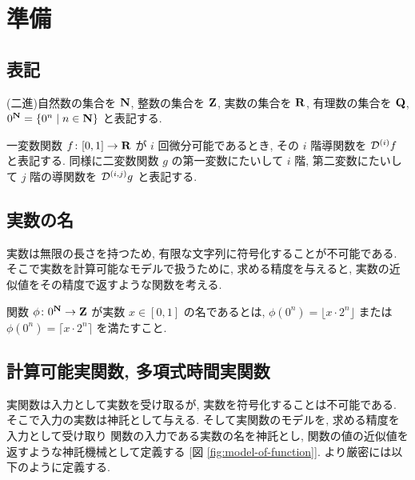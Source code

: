 \section{準備}
\label{section: preliminaries}

\subsection{表記}
(二進)自然数の集合を $\mathbf N$, 整数の集合を $\mathbf Z$, 実数の集合を $\mathbf R$, 
有理数の集合を $\mathbf Q$, $0^\mathbf N = \{0^n \mid n \in \mathbf N\}$ と表記する. 

一変数関数 $f\colon [0,1] \to \mathbf R$ が $i$ 回微分可能であるとき,
その $i$ 階導関数を $\mathcal D^{(i)}f$ と表記する.
同様に二変数関数 $g$ の第一変数にたいして $i$ 階, 第二変数にたいして $j$ 階の導関数を $\mathcal D^{(i,j)}g$ と表記する.

\subsection{実数の名}
 実数は無限の長さを持つため, 有限な文字列に符号化することが不可能である.
 そこで実数を計算可能なモデルで扱うために, 
 求める精度を与えると, 実数の近似値をその精度で返すような関数を考える.

\begin{definition}[実数の名]
 関数 $\phi \colon 0^\mathbf N \to \mathbf Z $ が実数 $x \in [0,1]$ の名であるとは,
 $\phi(0^n) = \lfloor x \cdot 2^n \rfloor$ または
 $\phi(0^n) = \lceil x \cdot 2^n \rceil$ を満たすこと.
\end{definition}

\subsection{計算可能実関数, 多項式時間実関数}
 実関数は入力として実数を受け取るが, 実数を符号化することは不可能である.
 そこで入力の実数は神託として与える.
 そして実関数のモデルを, 求める精度を入力として受け取り
 関数の入力である実数の名を神託とし, 関数の値の近似値を返すような神託機械として定義する
 [図 \ref{fig:model-of-function}].
 より厳密には以下のように定義する.

